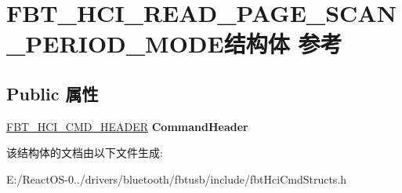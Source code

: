 \hypertarget{struct_f_b_t___h_c_i___r_e_a_d___p_a_g_e___s_c_a_n___p_e_r_i_o_d___m_o_d_e}{}\section{F\+B\+T\+\_\+\+H\+C\+I\+\_\+\+R\+E\+A\+D\+\_\+\+P\+A\+G\+E\+\_\+\+S\+C\+A\+N\+\_\+\+P\+E\+R\+I\+O\+D\+\_\+\+M\+O\+D\+E结构体 参考}
\label{struct_f_b_t___h_c_i___r_e_a_d___p_a_g_e___s_c_a_n___p_e_r_i_o_d___m_o_d_e}
\subsection*{Public 属性}
\begin{DoxyCompactItemize}
\item 
\mbox{\label{struct_f_b_t___h_c_i___r_e_a_d___p_a_g_e___s_c_a_n___p_e_r_i_o_d___m_o_d_e_a9214385b6642c6f02d6ecd3b3e813904}} 
\hyperlink{struct_f_b_t___h_c_i___c_m_d___h_e_a_d_e_r}{F\+B\+T\+\_\+\+H\+C\+I\+\_\+\+C\+M\+D\+\_\+\+H\+E\+A\+D\+ER} {\bfseries Command\+Header}
\end{DoxyCompactItemize}


该结构体的文档由以下文件生成\+:\begin{DoxyCompactItemize}
\item 
E\+:/\+React\+O\+S-\/0../drivers/bluetooth/fbtusb/include/fbt\+Hci\+Cmd\+Structs.\+h\end{DoxyCompactItemize}

